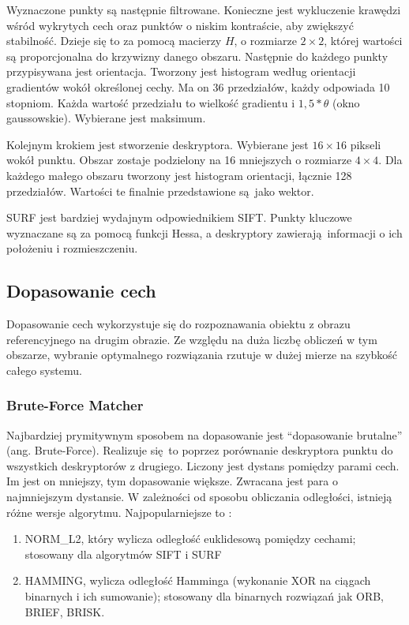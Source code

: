 \documentclass[12pt,twoside,polish]{article}
\begin{document}
Wyznaczone punkty są następnie filtrowane. Konieczne jest wykluczenie krawędzi wśród wykrytych cech oraz punktów o niskim kontraście, aby zwiększyć stabilność. Dzieje się to za pomocą macierzy $H$, o rozmiarze $2 \times 2$, której wartości są proporcjonalna do krzywizny danego obszaru. Następnie do każdego punkty przypisywana jest orientacja. Tworzony jest histogram według orientacji gradientów wokół określonej cechy. Ma on 36 przedziałów, każdy odpowiada 10 stopniom. Każda wartość przedziału to wielkość gradientu i $1,5 * \theta$ (okno gaussowskie). Wybierane jest maksimum.

Kolejnym krokiem jest stworzenie deskryptora. Wybierane jest $16 \times 16$ pikseli wokół punktu. Obszar zostaje podzielony na 16 mniejszych o rozmiarze $4 \times 4$. Dla każdego małego obszaru tworzony jest histogram orientacji, łącznie 128 przedziałów. Wartości te finalnie przedstawione są jako wektor.

SURF jest bardziej wydajnym odpowiednikiem SIFT. Punkty kluczowe wyznaczane są za pomocą funkcji Hessa, a deskryptory zawierają informacji o ich położeniu i rozmieszczeniu.

\subsection{Dopasowanie cech}
Dopasowanie cech wykorzystuje się do rozpoznawania obiektu z obrazu referencyjnego na drugim obrazie. Ze względu na duża liczbę obliczeń w tym obszarze, wybranie optymalnego rozwiązania rzutuje w dużej mierze na szybkość całego systemu. 

\subsubsection{Brute-Force Matcher}
Najbardziej prymitywnym sposobem na dopasowanie jest \enquote{dopasowanie brutalne} (ang. Brute-Force). Realizuje się to poprzez porównanie deskryptora punktu do wszystkich deskryptorów z drugiego. Liczony jest dystans pomiędzy parami cech. Im jest on mniejszy, tym dopasowanie większe. Zwracana jest para o najmniejszym dystansie. W zależności od sposobu obliczania odległości, istnieją różne wersje algorytmu. Najpopularniejsze to \cite[s.573]{learnopencv}:

\begin{enumerate}[label=\alph*), leftmargin=1.25cm]
\item NORM\_L2, który wylicza odległość euklidesową pomiędzy cechami; stosowany dla algorytmów SIFT i SURF
\item HAMMING, wylicza odległość Hamminga (wykonanie XOR na ciągach binarnych i ich sumowanie); stosowany  dla binarnych rozwiązań jak ORB, BRIEF, BRISK.
\end{enumerate}
\end{document}

